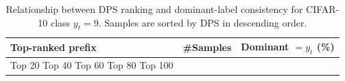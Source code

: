 \begin{table}[t]
\centering
\begin{tabular}{lrr}
\toprule
Top-ranked prefix & \#Samples & Dominant $= y_t$ (\%) \\
\midrule
Top 20%
Top 40%
Top 60%
Top 80%
Top 100%
\bottomrule
\caption{Relationship between DPS ranking and dominant-label consistency for CIFAR-10 class $y_t=9$. Samples are sorted by DPS in descending order.}
\label{tab:class_9_prefix}
\end{tabular}
\end{table}
